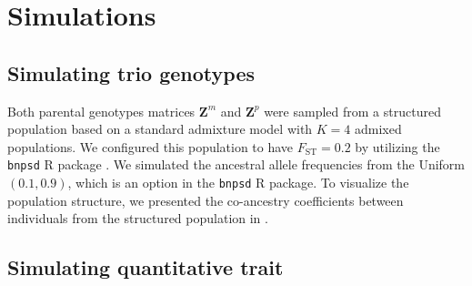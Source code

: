 \documentclass[12pt]{extarticle}
\newcommand{\ace}{{\normalfont \text{ACE}}}
\begin{document}
{{%

\clearpage
\section{Simulations}

\subsection{Simulating trio genotypes} \label{app:sim_trio_geno}

Both parental genotypes matrices $\boldsymbol{Z}^m$ and $\boldsymbol{Z}^p$ were sampled from a structured population based on a standard admixture model \citep{alexander2009,cabreros2019} with $K=4$ admixed populations. We configured this population to have $F_{\text{ST}} = 0.2$ by utilizing the \texttt{bnpsd} R package \citep{ochoa2021,bnpsd2021package}. We simulated the ancestral allele frequencies  from the Uniform$(0.1, 0.9)$, which is an option in the \texttt{bnpsd} R package. To visualize the population structure, we presented the co-ancestry coefficients between individuals from the structured population in .

\subsection{Simulating quantitative trait} \label{app:sim_quant_trait}

}}
\end{document}
